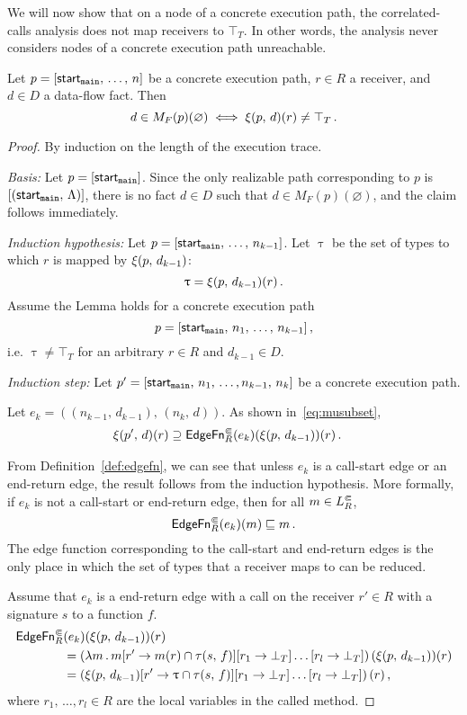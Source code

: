 We will now show that on a node of a concrete execution path, the correlated-calls analysis does not map receivers to $\top_T$. In other words, the analysis never considers nodes of a concrete execution path unreachable.

\begin{lemma}\label{lem:sound3}
  Let $p=[\textsf{start}_\texttt{main},\,\dots,\,n]$ be a concrete execution path, $r\in R$ a receiver, and $d\in D$ a data-flow fact. Then
  \begin{equation}
    d\in M_F(p)(\varnothing)\iff\xi(p,\,d)(r)\ne\top_T\,.
  \end{equation}
\end{lemma}
\begin{proof}
  By induction on the length of the execution trace.
  
  \textit{Basis:} 
    Let $p=[\textsf{start}_\texttt{main}]$. Since the only realizable path corresponding to $p$ is $[(\textsf{start}_\texttt{main},\,\Lambda)]$, there is no fact $d\in D$ such that $d\in M_F(p)(\varnothing)$, and the claim follows immediately.
  
  \textit{Induction hypothesis:} 
  Let $p=[\textsf{start}_\texttt{main},\,\dots,\,n_{k-1}]$. Let $\uptau$ be the set of types to which $r$ is mapped by $\xi(p,\,d_{k-1})$:
  \begin{equation}
    \uptau=\xi(p,\,d_{k-1})(r)\,.
  \end{equation}
  Assume the Lemma holds for a concrete execution path $$p=[\textsf{start}_\texttt{main},\,n_1,\,\dots,\,n_{k-1}]\,,$$ i.e. $\uptau\ne\top_T$ for an arbitrary $r\in R$ and $d_{k-1}\in D$.
  
  \textit{Induction step:}
    Let $p'=[\textsf{start}_\texttt{main},\,n_1,\,\dots,n_{k-1},\,n_k]$ be a concrete execution path.
    
    Let $e_k=((n_{k-1},\,d_{k-1}),\,(n_k,\,d))$. As shown in~\eqref{eq:musubset},
    \begin{align*}
      \xi(p',\,d)(r)
        &\supseteq\textsf{EdgeFn}^\Subset_{R}(e_k)(\xi(p,\,d_{k-1}))(r)\,.
    \end{align*}

    From Definition~\ref{def:edgefn}, we can see that unless $e_k$ is a call-start edge or an end-return edge, the result follows from the induction hypothesis.
    More formally, if $e_k$ is not a call-start or end-return edge, then for all $m\in L^\Subset_R$,
    \[
      \textsf{EdgeFn}^\Subset_{R}(e_k)(m)\sqsubseteq m\,.
    \]
     The edge function corresponding to the call-start and end-return edges is the only place in which the set of types that a receiver maps to can be reduced.
    
    Assume that $e_k$ is a end-return edge with a call on the receiver $r'\in R$ with a signature $s$ to a function $f$.
    \begin{align*}
      \textsf{EdgeFn}^\Subset_{R}&(e_k)(\xi(p,\,d_{k-1}))(r)\\
      &=\left(\lambda m\,.\,m[r'\to m(r)\cap\tau(s,\,f)][r_1\to\bot_T]\dots[r_l\to\bot_T]\right)(\xi(p,\,d_{k-1}))(r)\\
      &=\left(\xi(p,\,d_{k-1})[r'\to \uptau\cap\tau(s,\,f)][r_1\to\bot_T]\dots[r_l\to\bot_T]\right)(r)\,,
    \end{align*}
  where $r_1,\,\dots,r_l\in R$ are the local variables in the called method.
    

\end{proof}
